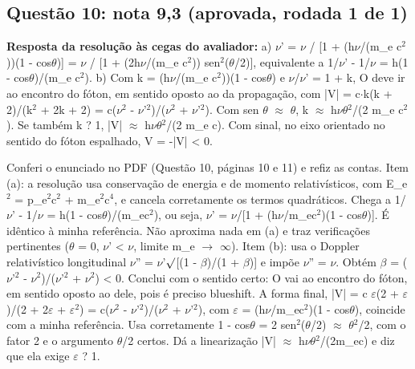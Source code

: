 \documentclass{article}%
\begin{document}
\subsection*{Questão 10: nota 9,3 (aprovada, rodada 1 de 1)}%
\textbf{Resposta da resolução às cegas do avaliador:} a) $\nu$' = $\nu$ / {[}1 + (h$\nu$/(m\_e c$^2$))(1 - cos$\theta$){]} = $\nu$ / {[}1 + (2h$\nu$/(m\_e c$^2$)) sen$^2$($\theta$/2){]}, equivalente a 1/$\nu$' - 1/$\nu$ = h(1 - cos$\theta$)/(m\_e c$^2$).\newline%
\newline%
b) Com k = (h$\nu$/(m\_e c$^2$))(1 - cos$\theta$) e $\nu$/$\nu$' = 1 + k, O deve ir ao encontro do fóton, em sentido oposto ao da propagação, com\newline%
|V| = c$\cdot$k(k + 2)/(k$^2$ + 2k + 2) = c($\nu$$^2$ - $\nu$'$^2$)/($\nu$$^2$ + $\nu$'$^2$).\newline%
\newline%
Com sen $\theta$ $\approx$ $\theta$, k $\approx$ h$\nu$$\theta$$^2$/(2 m\_e c$^2$). Se também k ? 1, |V| $\approx$ h$\nu$$\theta$$^2$/(2 m\_e c).\newline%
\newline%
Com sinal, no eixo orientado no sentido do fóton espalhado, V = -|V| < 0.\par %
Conferi o enunciado no PDF (Questão 10, páginas 10 e 11) e refiz as contas.\newline%
\newline%
Item (a): a resolução usa conservação de energia e de momento relativísticos, com E\_e$^2$ = p\_e$^2$c$^2$ + m\_e$^2$c$^{4}$, e cancela corretamente os termos quadráticos. Chega a 1/$\nu$' - 1/$\nu$ = h(1 - cos$\theta$)/(m\_ec$^2$), ou seja, $\nu$' = $\nu$/{[}1 + (h$\nu$/m\_ec$^2$)(1 - cos$\theta$){]}. É idêntico à minha referência. Não aproxima nada em (a) e traz verificações pertinentes ($\theta$ = 0, $\nu$' < $\nu$, limite m\_e $\to$ $\infty$).\newline%
\newline%
Item (b): usa o Doppler relativístico longitudinal $\nu$'' = $\nu$'$\surd${[}(1 - $\beta$)/(1 + $\beta$){]} e impõe $\nu$'' = $\nu$. Obtém $\beta$ = ($\nu$'$^2$ - $\nu$$^2$)/($\nu$'$^2$ + $\nu$$^2$) < 0. Conclui com o sentido certo: O vai ao encontro do fóton, em sentido oposto ao dele, pois é preciso blueshift. A forma final, |V| = c $\varepsilon$(2 + $\varepsilon$)/(2 + 2$\varepsilon$ + $\varepsilon$$^2$) = c($\nu$$^2$ - $\nu$'$^2$)/($\nu$$^2$ + $\nu$'$^2$), com $\varepsilon$ = (h$\nu$/m\_ec$^2$)(1 - cos$\theta$), coincide com a minha referência.\newline%
\newline%
Usa corretamente 1 - cos$\theta$ = 2 sen$^2$($\theta$/2) $\approx$ $\theta$$^2$/2, com o fator 2 e o argumento $\theta$/2 certos. Dá a linearização |V| $\approx$ h$\nu$$\theta$$^2$/(2m\_ec) e diz que ela exige $\varepsilon$ ? 1.\newline%
\end{document}
